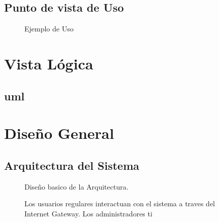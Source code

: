 \documentclass{article}
\begin{document}
\subsection{Punto de vista de Uso}

  \begin{figure}[!htb]
    \begin{center}
      
    \end{center}
    \caption{Ejemplo de Uso}\label{fig:}
  \end{figure}
  

\section{Vista L\'ogica}
\subsection{uml}

\begin{figure}[!htb]
  \begin{center}
    
  \end{center}
  \caption{}\label{fig:}
\end{figure}


\section{Dise\~no General}
  
  \subsection{Arquitectura del Sistema}
  \begin{figure}
    \begin{center}
      
    \end{center}
    \caption{}\label{fig: Arquitectura Basica}
  Dise\~no basico de la Arquitectura.
  \end{figure}

  \begin{figure}
    \begin{center}
      
    \end{center}
    \caption{}\label{fig: Implementacion en la Nube}
    Los usuarios regulares interactuan con el sistema a traves del Internet Gateway.
    Los administradores ti

  \end{figure}
\end{document}
